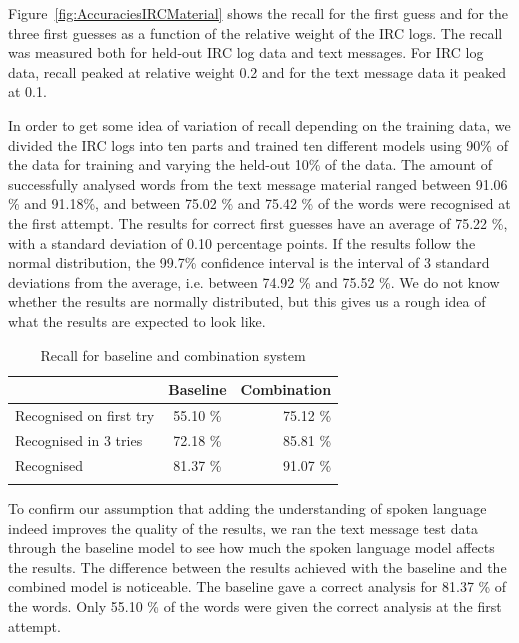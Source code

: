 \documentclass[a4paper,conference]{IEEEtran}
\begin{document}
Figure~\ref{fig:AccuraciesIRCMaterial} shows the recall for the first
guess and for the three first guesses as a function of the relative
weight of the IRC logs. The recall was measured both for held-out
IRC log data and text messages. For IRC log data, recall peaked
at relative weight 0.2 and for the text message data it peaked at 0.1.

In order to get some idea of variation of recall depending on the
training data, we divided the IRC logs into ten parts and trained ten
different models using 90\% of the data for training and varying the
held-out 10\% of the data. The amount of successfully analysed words
from the text message material ranged between 91.06 \% and 91.18\%,
and between 75.02 \% and 75.42 \% of the words were recognised at the
first attempt. The results for correct first guesses have an average
of 75.22 \%, with a standard deviation of 0.10 percentage points. If
the results follow the normal distribution, the 99.7\% confidence
interval is the interval of 3 standard deviations from the average,
i.e. between 74.92 \% and 75.52 \%. We do not know whether the results
are normally distributed, but this gives us a rough idea of what the
results are expected to look like.

\begin{table}[!t]
\caption{Recall for baseline and combination system}
\begin{center}
\begin{tabular} {l c r}
 & Baseline & Combination \\
 \hline
Recognised on first try \rule{0pt}{2.6ex} & 55.10 \% & 75.12 \% \\
Recognised in 3 tries & 72.18 \% & 85.81 \% \\
Recognised & 81.37 \% & 91.07 \% \\
\hline
 & & \\
\end{tabular}
\end{center}
\label{tab:recall}
\end{table}


To confirm our assumption that adding the understanding of spoken
language indeed improves the quality of the results, we ran the text
message test data through the baseline model to see how much the
spoken language model affects the results. The difference between the
results achieved with the baseline and the combined model is
noticeable. The baseline gave a correct analysis for 81.37 \% of the
words. Only 55.10 \% of the words were given the correct analysis at
the first attempt.
\end{document}
